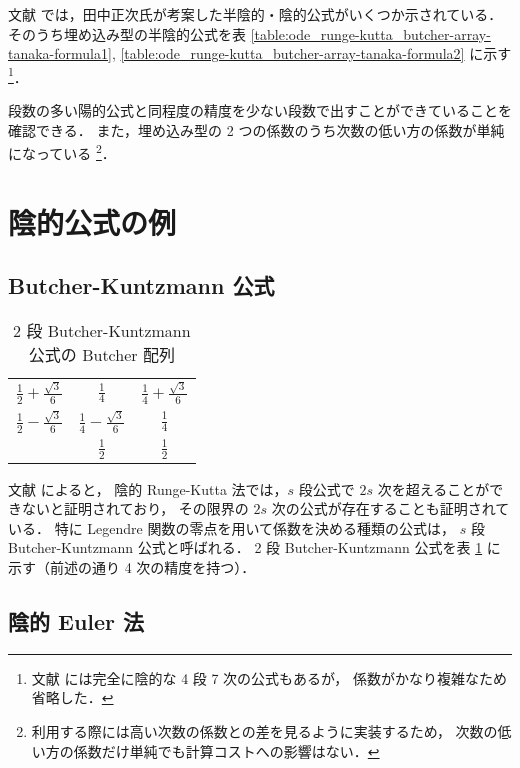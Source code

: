 文献 \cite{Togawa2007} では，田中正次氏が考案した半陰的・陰的公式がいくつか示されている．
そのうち埋め込み型の半陰的公式を表
\ref{table:ode_runge-kutta_butcher-array-tanaka-formula1},
\ref{table:ode_runge-kutta_butcher-array-tanaka-formula2}
に示す
\footnote{文献 \cite{Togawa2007} には完全に陰的な 4 段 7 次の公式もあるが，%
    係数がかなり複雑なため省略した．}．

段数の多い陽的公式と同程度の精度を少ない段数で出すことができていることを確認できる．
また，埋め込み型の 2 つの係数のうち次数の低い方の係数が単純になっている
\footnote{利用する際には高い次数の係数との差を見るように実装するため，%
    次数の低い方の係数だけ単純でも計算コストへの影響はない．}．

\section{陰的公式の例}

\subsection{Butcher-Kuntzmann 公式}

\begin{table}[bp]
    \caption{2 段 Butcher-Kuntzmann 公式の Butcher 配列}
    \label{table:ode_runge-kutta_butcher-array-2stage-butcher-kuntzmann}
    \centering
    \begin{tabular}{c|cc}
        $\frac{1}{2} + \frac{\sqrt{3}}{6}$ & $\frac{1}{4}$                      & $\frac{1}{4} + \frac{\sqrt{3}}{6}$ \\
        $\frac{1}{2} - \frac{\sqrt{3}}{6}$ & $\frac{1}{4} - \frac{\sqrt{3}}{6}$ & $\frac{1}{4}$                      \\
        \hline
                                           & $\frac{1}{2}$                      & $\frac{1}{2}$
    \end{tabular}
\end{table}

文献 \cite[5.2 節 (b)]{Mitsui1993} によると，
陰的 Runge-Kutta 法では，$s$ 段公式で $2s$ 次を超えることができないと証明されており，
その限界の $2s$ 次の公式が存在することも証明されている．
特に Legendre 関数の零点を用いて係数を決める種類の公式は，
$s$ 段 Butcher-Kuntzmann 公式と呼ばれる．
2 段 Butcher-Kuntzmann 公式を表
\ref{table:ode_runge-kutta_butcher-array-2stage-butcher-kuntzmann}
に示す（前述の通り 4 次の精度を持つ）．

\subsection{陰的 Euler 法}

